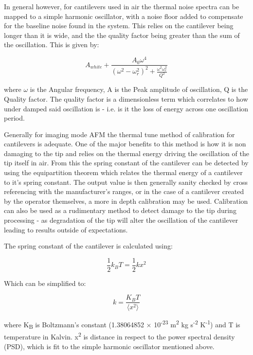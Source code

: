In general however, for cantilevers used in air the thermal noise spectra can be mapped to a simple harmonic oscillator, with a noise floor added to compensate for the baseline noise found in the system. This relies on the cantilever being longer than it is wide, and the the quality factor being greater than the sum of the oscillation. This is given by:

\begin{equation}
A_{white} + \frac{A_0 \omega^4}{(\omega^2 - \omega^2_r)^2 + \frac{\omega^2 \omega^2_r}{Q^2}}
\end{equation}

where $\omega$ is the Angular frequency, A is the Peak amplitude of oscillation, Q is the Quality factor. The quality factor is a dimensionless term which correlates to how under damped said oscillation is - i.e. is it the loss of energy across one oscillation period. 

Generally for imaging mode AFM the thermal tune method of calibration for cantilevers is adequate. One of the major benefits to this method is how it is non damaging to the tip and relies on the thermal energy driving the oscillation of the tip itself in air. From this the spring constant of the cantilever can be detected by using the equipartition theorem which relates the thermal energy of a cantilever to it's spring constant. The output value is then generally sanity checked by cross referencing with the manufacturer's ranges, or in the case of a cantilever created by the operator themselves, a more in depth calibration may be used. Calibration can also be used as a rudimentary method to detect damage to the tip during processing - as degradation of the tip will alter the oscillation of the cantilever leading to results outside of expectations. 

The spring constant of the cantilever is calculated using:

\begin{equation}
\frac{1}{2}k_{B}T = \frac{1}{2}kx^{2}
\end{equation}

Which can be simplified to:

\begin{equation}
k = \frac{K_{B}T}{\langle x^{2} \rangle}
\end{equation}

where K\textsubscript{B} is Boltzmann's constant (1.38064852 × 10\textsuperscript{-23} m\textsuperscript{2} kg s\textsuperscript{-2} K\textsuperscript{-1}) and T is temperature in Kalvin. x\textsuperscript{2} is distance in respect to the power spectral density (PSD), which is fit to the simple harmonic oscillator mentioned above. \cite{ThermalCalc, JankThesis}

